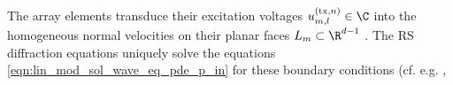 The array elements transduce
their excitation voltages
$u_{m, l}^{(\text{tx}, n)} \in \C$ into
the homogeneous normal velocities on
their planar faces
$L_{m} \subset \R^{d-1}$
\cite{article:LabyedITUFFC2014,article:NgITUFFC2006}.
The \acl{RS} diffraction equations uniquely solve
the  equations
\eqref{eqn:lin_mod_sol_wave_eq_pde_p_in} for
these boundary conditions
(cf. e.g.
\cite[(2.48)]{book:Devaney2012},		%
\cite[(13) of §8.11]{book:Born1999}%
